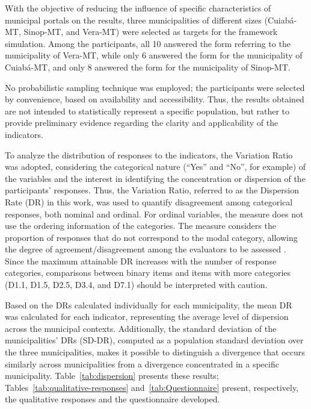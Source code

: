 \documentclass[12pt]{article}
\begin{document}
With the objective of reducing the influence of specific characteristics of municipal portals on the results, three municipalities of different sizes (Cuiabá-MT, Sinop-MT, and Vera-MT) were selected as targets for the framework simulation. Among the participants, all 10 answered the form referring to the municipality of Vera-MT, while only 6 answered the form for the municipality of Cuiabá-MT, and only 8 answered the form for the municipality of Sinop-MT.

No probabilistic sampling technique was employed; the participants were selected by convenience, based on availability and accessibility. Thus, the results obtained are not intended to statistically represent a specific population, but rather to provide preliminary evidence regarding the clarity and applicability of the indicators.

To analyze the distribution of responses to the indicators, the Variation Ratio was adopted, considering the categorical nature (``Yes'' and ``No'', for example) of the variables and the interest in identifying the concentration or dispersion of the participants' responses. Thus, the Variation Ratio, referred to as the Dispersion Rate (DR) in this work, was used to quantify disagreement among categorical responses, both nominal and ordinal. For ordinal variables, the measure does not use the ordering information of the categories. The measure considers the proportion of responses that do not correspond to the modal category, allowing the degree of agreement/disagreement among the evaluators to be assessed \cite{freeman1965}. Since the maximum attainable DR increases with the number of response categories, comparisons between binary items and items with more categories (D1.1, D1.5, D2.5, D3.4, and D7.1) should be interpreted with caution.

Based on the DRs calculated individually for each municipality, the mean DR was calculated for each indicator, representing the average level of dispersion across the municipal contexts. Additionally, the standard deviation of the municipalities' DRs (SD-DR), computed as a population standard deviation over the three municipalities, makes it possible to distinguish a divergence that occurs similarly across municipalities from a divergence concentrated in a specific municipality. Table~\ref{tab:dispersion} presents these results; Tables~\ref{tab:qualitative-responses} and~\ref{tab:Questionnaire} present, respectively, the qualitative responses and the questionnaire developed.
\end{document}

